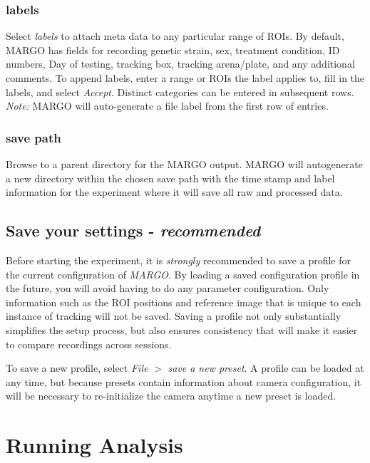 \documentclass[11pt]{article}
\begin{document}
\subsubsection{labels}

Select \textit{labels} to attach meta data to any particular range of ROIs. By default, MARGO has fields for recording genetic strain, sex, treatment condition, ID numbers, Day of testing, tracking box, tracking arena/plate, and any additional comments. To append labels, enter a range or ROIs the label applies to, fill in the labels, and select \textit{Accept}. Distinct categories can be entered in subsequent rows. \textit{Note:} MARGO will auto-generate a file label from the first row of entries.
 
\subsubsection{save path}

Browse to a parent directory for the MARGO output. MARGO will autogenerate a new directory within the chosen save path with the time stamp and label information for the experiment where it will save all raw and processed data. 

\hypertarget{saveprofile}{\subsection{Save your settings - \textit{recommended}}}

Before starting the experiment, it is \textit{strongly} recommended to save a profile for the current configuration of \textit{MARGO}. By loading a saved configuration profile in the future, you will avoid having to do any parameter configuration. Only information such as the ROI positions and reference image that is unique to each instance of tracking will not be saved. Saving a profile not only substantially simplifies the setup process, but also ensures consistency that will make it easier to compare recordings across sessions.

To save a new profile, select \textit{File} $>$ \textit{save a new preset}. A profile can be loaded at any time, but because presets contain information about camera configuration, it will be necessary to re-initialize the camera anytime a new preset is loaded.

\newpage
\section{Running Analysis}
\end{document}
